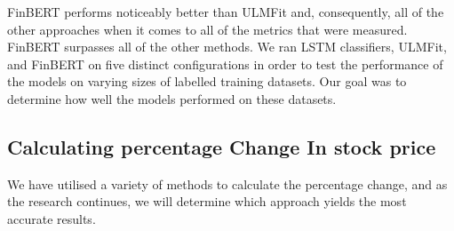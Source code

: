 \documentclass[12pt, a4paper,twoside]{report}
\theoremstyle{plain} %
\theoremstyle{definition} %
\theoremstyle{remark} %
\numberwithin{equation}{chapter}
\begin{document}
         FinBERT performs noticeably better than ULMFit and, consequently, all of the other approaches when it comes to all of the metrics that were measured. FinBERT surpasses all of the other methods. We ran LSTM classifiers, ULMFit, and FinBERT on five distinct configurations in order to test the performance of the models on varying sizes of labelled training datasets. Our goal was to determine how well the models performed on these datasets. \cite{araci2019finbert}

    \subsection{Calculating percentage Change In stock price}

We have utilised a variety of methods to calculate the percentage change, and as the research continues, we will determine which approach yields the most accurate results.
\end{document}
